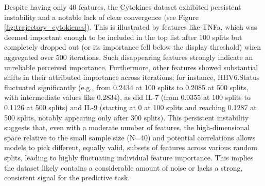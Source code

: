 \documentclass[12pt,a4paper]{report}
\begin{document}
\noindent
Despite having only 40 features, the Cytokines dataset exhibited persistent instability and a notable lack of clear convergence (see Figure \ref{fig:trajectory_cytokienes}). This is illustrated by features like TNFa, which was deemed important enough to be included in the top list after 100 splits but completely dropped out (or its importance fell below the display threshold) when aggregated over 500 iterations. Such disappearing features strongly indicate an unreliable perceived importance. Furthermore, other features showed substantial shifts in their attributed importance across iterations; for instance, HHV6.Status fluctuated significantly (e.g., from 0.2434 at 100 splits to 0.2085 at 500 splits, with intermediate values like 0.2834), as did IL-7 (from 0.0355 at 100 splits to 0.1126 at 500 splits) and IL-9 (starting at 0 at 100 splits and reaching 0.1287 at 500 splits, notably appearing only after 300 splits). This persistent instability suggests that, even with a moderate number of features, the high-dimensional space relative to the small sample size (N=40) and potential correlations allows models to pick different, equally valid, subsets of features across various random splits, leading to highly fluctuating individual feature importance. This implies the dataset likely contains a considerable amount of noise or lacks a strong, consistent signal for the predictive task.\\
\\
\end{document}
